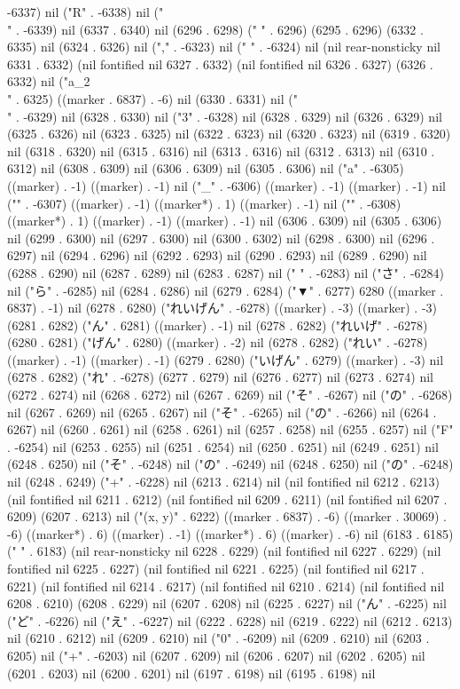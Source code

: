 -6337) nil ("R" . -6338) nil ("\\" . -6339) nil (6337 . 6340) nil (6296 . 6298) (" " . 6296) (6295 . 6296) (6332 . 6335) nil (6324 . 6326) nil ("," . -6323) nil (" " . -6324) nil (nil rear-nonsticky nil 6331 . 6332) (nil fontified nil 6327 . 6332) (nil fontified nil 6326 . 6327) (6326 . 6332) nil ("a_{2}\\" . 6325) ((marker . 6837) . -6) nil (6330 . 6331) nil ("\\" . -6329) nil (6328 . 6330) nil ("3" . -6328) nil (6328 . 6329) nil (6326 . 6329) nil (6325 . 6326) nil (6323 . 6325) nil (6322 . 6323) nil (6320 . 6323) nil (6319 . 6320) nil (6318 . 6320) nil (6315 . 6316) nil (6313 . 6316) nil (6312 . 6313) nil (6310 . 6312) nil (6308 . 6309) nil (6306 . 6309) nil (6305 . 6306) nil ("a" . -6305) ((marker) . -1) ((marker) . -1) nil ("_" . -6306) ((marker) . -1) ((marker) . -1) nil ("{" . -6307) ((marker) . -1) ((marker*) . 1) ((marker) . -1) nil ("}" . -6308) ((marker*) . 1) ((marker) . -1) ((marker) . -1) nil (6306 . 6309) nil (6305 . 6306) nil (6299 . 6300) nil (6297 . 6300) nil (6300 . 6302) nil (6298 . 6300) nil (6296 . 6297) nil (6294 . 6296) nil (6292 . 6293) nil (6290 . 6293) nil (6289 . 6290) nil (6288 . 6290) nil (6287 . 6289) nil (6283 . 6287) nil (" " . -6283) nil ("さ" . -6284) nil ("ら" . -6285) nil (6284 . 6286) nil (6279 . 6284) ("▼" . 6277) 6280 ((marker . 6837) . -1) nil (6278 . 6280) ("れいげん" . -6278) ((marker) . -3) ((marker) . -3) (6281 . 6282) ("ん" . 6281) ((marker) . -1) nil (6278 . 6282) ("れいげ" . -6278) (6280 . 6281) ("げん" . 6280) ((marker) . -2) nil (6278 . 6282) ("れい" . -6278) ((marker) . -1) ((marker) . -1) (6279 . 6280) ("いげん" . 6279) ((marker) . -3) nil (6278 . 6282) ("れ" . -6278) (6277 . 6279) nil (6276 . 6277) nil (6273 . 6274) nil (6272 . 6274) nil (6268 . 6272) nil (6267 . 6269) nil ("そ" . -6267) nil ("の" . -6268) nil (6267 . 6269) nil (6265 . 6267) nil ("そ" . -6265) nil ("の" . -6266) nil (6264 . 6267) nil (6260 . 6261) nil (6258 . 6261) nil (6257 . 6258) nil (6255 . 6257) nil ("F" . -6254) nil (6253 . 6255) nil (6251 . 6254) nil (6250 . 6251) nil (6249 . 6251) nil (6248 . 6250) nil ("そ" . -6248) nil ("の" . -6249) nil (6248 . 6250) nil ("の" . -6248) nil (6248 . 6249) ("+" . -6228) nil (6213 . 6214) nil (nil fontified nil 6212 . 6213) (nil fontified nil 6211 . 6212) (nil fontified nil 6209 . 6211) (nil fontified nil 6207 . 6209) (6207 . 6213) nil ("(x, y)" . 6222) ((marker . 6837) . -6) ((marker . 30069) . -6) ((marker*) . 6) ((marker) . -1) ((marker*) . 6) ((marker) . -6) nil (6183 . 6185) ("   " . 6183) (nil rear-nonsticky nil 6228 . 6229) (nil fontified nil 6227 . 6229) (nil fontified nil 6225 . 6227) (nil fontified nil 6221 . 6225) (nil fontified nil 6217 . 6221) (nil fontified nil 6214 . 6217) (nil fontified nil 6210 . 6214) (nil fontified nil 6208 . 6210) (6208 . 6229) nil (6207 . 6208) nil (6225 . 6227) nil ("ん" . -6225) nil ("ど" . -6226) nil ("え" . -6227) nil (6222 . 6228) nil (6219 . 6222) nil (6212 . 6213) nil (6210 . 6212) nil (6209 . 6210) nil ("0" . -6209) nil (6209 . 6210) nil (6203 . 6205) nil ("+" . -6203) nil (6207 . 6209) nil (6206 . 6207) nil (6202 . 6205) nil (6201 . 6203) nil (6200 . 6201) nil (6197 . 6198) nil (6195 . 6198) nil 